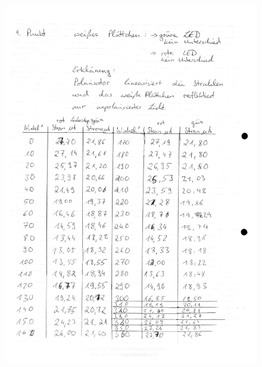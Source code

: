 \documentclass[fontsize=12pt]{scrartcl}
\begin{document}
\begin{figure}[H]
\vspace{-17pt}
        \includegraphics[scale=0.6]{Graphik/2}
        \vspace{-10pt}

\end{figure}
\end{document}
